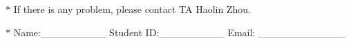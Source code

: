 \documentclass[12pt,a4paper]{article}
\theoremstyle{definition}
\begin{document}
\noindent

\noindent{}


\begin{center}
\footnotesize{\color{red}$*$ If there is any problem, please contact TA Haolin Zhou.}\par
\footnotesize{\color{blue}$*$ Name:\_\_\_\_\_\_\_\_\_  \quad Student ID:\_\_\_\_\_\_\_\_\_ \quad Email: \_\_\_\_\_\_\_\_\_\_\_\_}
\end{center}
\end{document}
